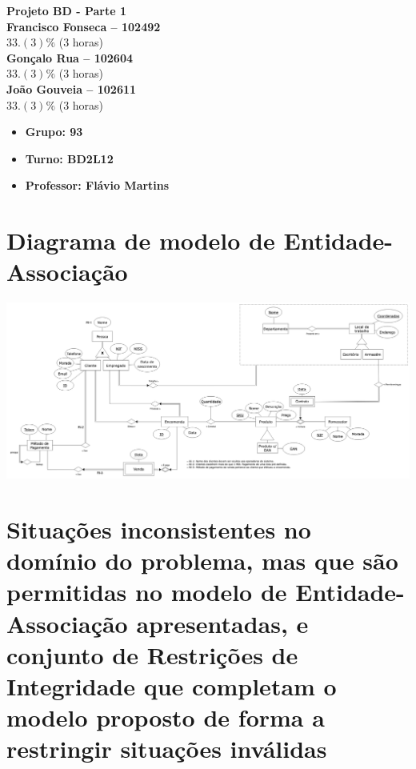 \documentclass{article}
\begin{document}
\begin{titlepage}

    \begin{center}
        {\Huge\bfseries Projeto BD - Parte 1\\}
        \vspace{1cm}
        {\Large\bfseries Francisco Fonseca -- 102492}\\[5pt]
        $33.(3)\%$ (3 horas)\\[14pt]
        {\Large\bfseries Gonçalo Rua -- 102604}\\[5pt]
        $33.(3)\%$ (3 horas)\\[14pt]
        {\Large\bfseries João Gouveia -- 102611}\\[5pt]
        $33.(3)\%$ (3 horas)\\[14pt]
    \end{center}

    \vspace{0.5cm}

    \begin{itemize}
        \item[] \Large\bfseries Grupo: 93
        \item[] \Large\bfseries Turno: BD2L12
        \item[] \Large\bfseries Professor: Flávio Martins
    \end{itemize}

\end{titlepage}

\section{Diagrama de modelo de Entidade-Associação}

\vspace{0.5cm}
\includegraphics[scale=0.2]{diagrama.png}
\vspace{0.5cm}

\section{Situações inconsistentes no domínio do problema, mas que são permitidas no modelo de Entidade-Associação apresentadas, e conjunto de Restrições de Integridade que completam o modelo proposto de forma a restringir situações inválidas}

\end{document}
